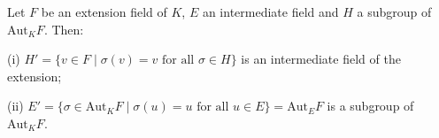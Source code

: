 Let $F$ be an extension field of $K$, $E$ an intermediate field and $H$ a subgroup of $\mathrm{Aut}_K F$. Then:

(i) $H' = \{v \in F \mid \sigma(v) = v \text{ for all } \sigma \in H\}$ is an intermediate field of the extension;

(ii) $E' = \{\sigma \in \mathrm{Aut}_K F \mid \sigma(u) = u \text{ for all } u \in E\} = \mathrm{Aut}_E F$ is a subgroup of $\mathrm{Aut}_K F$.
